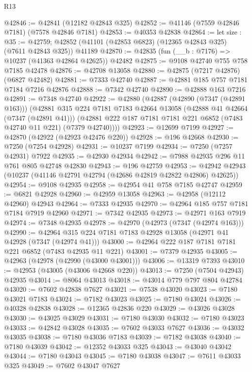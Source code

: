 \begin{lexlean}{R13}
\begin{coremodule}
@42846 := @42841 (@12182 @42843 @325)
@42852 := @41146 (@7559 @42846 @7181) (@7578 @42846 @7181)
@42853 := @40353 @42838
@42864 := let size : @35 := @42759;
  @42852 (@41101 (@42853 @6823) (@12365 @42843 @325) (@7611 @42843 @325)) @41189
@42870 := @42835 (fun (__b : @7176) => @10237 (@41363 @42864 @42625)) @42482
@42875 := @9108 @42740 @755 @758 @7185 @42478
@42876 := @42708 @13058
@42880 := @42875 (@7217 @42876) (@6827 @42482)
@42881 := @7333 @42740
@42887 := @42881 @185 @757 @7181 @7184 @7216 @42876
@42888 := @7342 @42740
@42890 := @42888 @163 @7216
@42891 := @7348 @42740
@42922 := @42880
    (@42887
      (@42890 (@7347 (@42891 @163)))
      (@42881
        @315
        @224
        @7181
        @7183
        @42664
        @13058
        (@42888 @41 @42664 (@7347 (@42891 @41)))
        (@42881 @222 @187 @7181 @7181 @221 @6852 (@7483 @42740 @11 @221) (@7379 @42740))))
@42923 := @12699 @7199
@42927 := @42870 (@42922 (@42923 @42476 @220))
@42928 := @196 @42668
@42930 := @7250 (@7254 @42928)
@42931 := @10237 @7199
@42934 := @7250 (@7257 @42931) @7922
@42935 := @42930 @42934
@42942 := @7988 @42935 @296 @11 @761 @805 @42748 @42830
@42943 := @196 @42759
@42953 := @42942 @42943 (@10237 (@41146 @42791 @42794 (@42686 @42819 @42822 @42806) @42625))
@42954 := @9108 @42935
@42958 := @42954 @41 @758 @7185 @42747
@42959 := @6821 @42928
@42960 := @42959 @13058
@42963 := @42958 (@12112 @42960) @42943
@42964 := @7333 @42935
@42970 := @42964 @185 @757 @7181 @7184 @7919 @42960
@42971 := @7342 @42935
@42973 := @42971 @163 @7919
@42974 := @7348 @42935
@42978 := @42970 (@42973 (@7347 (@42974 @163)))
@42990 := @42964 @315 @224 @7181 @7183 @42928 @13058 (@42971 @41 @42928 (@7347 (@42974 @41)))
@43000 := @42964 @222 @187 @7181 @7181 @221 @6852 (@7483 @42935 @11 @221)
@43001 := @7379 @42935
@43005 := @42963 (@42978 (@42990 (@43000 @43001)))
@43006 := @13319 @7393
@43010 := @42953 (@43005 (@43006 @42668 @220))
@43013 := @7250 (@7504 @42943) @42935
@43014 := @8064 @43013
@43018 := @43014 @779 @797 @804 @42784
@43020 := @7602 @42838 @7627
@43021 := @7538 @43020
@43023 := @7180 @43021 @7183
@43024 := @7182 @43023
@43025 := @7180 @43024
@43026 := @40328 @42838
@43028 := @12365 @42836 @220
@43029 := @43026 @43028
@43030 := @43025 @43029
@43031 := @7180 @43030
@43032 := @7180 @43023
@43033 := @42842 @43028
@43035 := @7602 @43033 @7627
@43036 := @43032 @43035
@43038 := @7180 @43036 @7183
@43039 := @7182 @43038
@43040 := @7180 @43039
@43042 := @12352 @43033 @325
@43043 := @43040 @43042
@43044 := @7180 @43043
@43045 := @7180 @43038
@43047 := @7611 @43033 @325
@43049 := @7602 @43047 @7627

\end{coremodule}
\end{lexlean}
